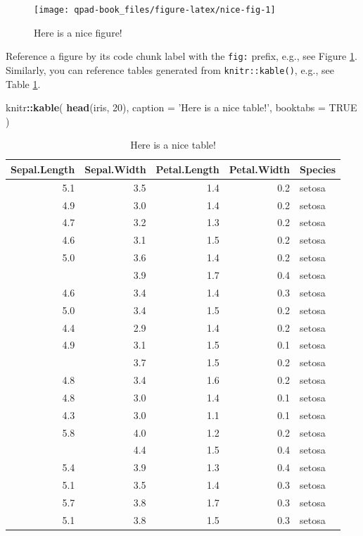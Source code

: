 \documentclass[12pt,]{book}
\newenvironment{Shaded}{\begin{snugshade}}{\end{snugshade}}
\newcommand{\DataTypeTok}[1]{\textcolor[rgb]{0.13,0.29,0.53}{#1}}
\newcommand{\DecValTok}[1]{\textcolor[rgb]{0.00,0.00,0.81}{#1}}
\newcommand{\KeywordTok}[1]{\textcolor[rgb]{0.13,0.29,0.53}{\textbf{#1}}}
\newcommand{\NormalTok}[1]{#1}
\newcommand{\OperatorTok}[1]{\textcolor[rgb]{0.81,0.36,0.00}{\textbf{#1}}}
\newcommand{\OtherTok}[1]{\textcolor[rgb]{0.56,0.35,0.01}{#1}}
\newcommand{\StringTok}[1]{\textcolor[rgb]{0.31,0.60,0.02}{#1}}
\begin{document}
\begin{figure}

{\centering \texttt{[image: qpad-book\_files/figure-latex/nice-fig-1]} 

}

\caption{Here is a nice figure!}\label{fig:nice-fig}
\end{figure}

Reference a figure by its code chunk label with the \texttt{fig:} prefix, e.g., see Figure \ref{fig:nice-fig}. Similarly, you can reference tables generated from \texttt{knitr::kable()}, e.g., see Table \ref{tab:nice-tab}.

\begin{Shaded}
\begin{Highlighting}[]
\NormalTok{knitr}\OperatorTok{::}\KeywordTok{kable}\NormalTok{(}
  \KeywordTok{head}\NormalTok{(iris, }\DecValTok{20}\NormalTok{), }\DataTypeTok{caption =} \StringTok{'Here is a nice table!'}\NormalTok{,}
  \DataTypeTok{booktabs =} \OtherTok{TRUE}
\NormalTok{)}
\end{Highlighting}
\end{Shaded}

\begin{table}[t]

\caption{\label{tab:nice-tab}Here is a nice table!}
\centering
\begin{tabular}{rrrrl}
\toprule
Sepal.Length & Sepal.Width & Petal.Length & Petal.Width & Species\\
\midrule
5.1 & 3.5 & 1.4 & 0.2 & setosa\\
4.9 & 3.0 & 1.4 & 0.2 & setosa\\
4.7 & 3.2 & 1.3 & 0.2 & setosa\\
4.6 & 3.1 & 1.5 & 0.2 & setosa\\
5.0 & 3.6 & 1.4 & 0.2 & setosa\\
\addlinespace
5.4 & 3.9 & 1.7 & 0.4 & setosa\\
4.6 & 3.4 & 1.4 & 0.3 & setosa\\
5.0 & 3.4 & 1.5 & 0.2 & setosa\\
4.4 & 2.9 & 1.4 & 0.2 & setosa\\
4.9 & 3.1 & 1.5 & 0.1 & setosa\\
\addlinespace
5.4 & 3.7 & 1.5 & 0.2 & setosa\\
4.8 & 3.4 & 1.6 & 0.2 & setosa\\
4.8 & 3.0 & 1.4 & 0.1 & setosa\\
4.3 & 3.0 & 1.1 & 0.1 & setosa\\
5.8 & 4.0 & 1.2 & 0.2 & setosa\\
\addlinespace
5.7 & 4.4 & 1.5 & 0.4 & setosa\\
5.4 & 3.9 & 1.3 & 0.4 & setosa\\
5.1 & 3.5 & 1.4 & 0.3 & setosa\\
5.7 & 3.8 & 1.7 & 0.3 & setosa\\
5.1 & 3.8 & 1.5 & 0.3 & setosa\\
\bottomrule
\end{tabular}
\end{table}
\end{document}

